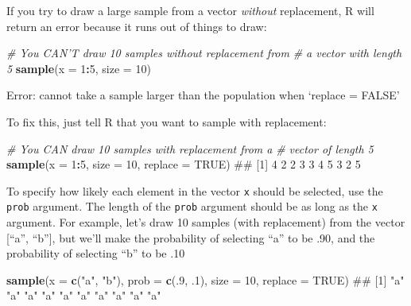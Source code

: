 \documentclass[]{book}
\newenvironment{Shaded}{\begin{snugshade}}{\end{snugshade}}
\newcommand{\KeywordTok}[1]{\textcolor[rgb]{0.13,0.29,0.53}{\textbf{#1}}}
\newcommand{\DataTypeTok}[1]{\textcolor[rgb]{0.13,0.29,0.53}{#1}}
\newcommand{\DecValTok}[1]{\textcolor[rgb]{0.00,0.00,0.81}{#1}}
\newcommand{\StringTok}[1]{\textcolor[rgb]{0.31,0.60,0.02}{#1}}
\newcommand{\CommentTok}[1]{\textcolor[rgb]{0.56,0.35,0.01}{\textit{#1}}}
\newcommand{\OtherTok}[1]{\textcolor[rgb]{0.56,0.35,0.01}{#1}}
\newcommand{\OperatorTok}[1]{\textcolor[rgb]{0.81,0.36,0.00}{\textbf{#1}}}
\newcommand{\NormalTok}[1]{#1}
\theoremstyle{definition}
\theoremstyle{definition}
\theoremstyle{remark}
\begin{document}
If you try to draw a large sample from a vector \textit{without}
replacement, R will return an error because it runs out of things to
draw:

\begin{Shaded}
\begin{Highlighting}[]
\CommentTok{# You CAN'T draw 10 samples without replacement from}
\CommentTok{#  a vector with length 5}
\KeywordTok{sample}\NormalTok{(}\DataTypeTok{x =} \DecValTok{1}\OperatorTok{:}\DecValTok{5}\NormalTok{, }\DataTypeTok{size =} \DecValTok{10}\NormalTok{)}
\end{Highlighting}
\end{Shaded}

Error: cannot take a sample larger than the population when `replace =
FALSE'

To fix this, just tell R that you want to sample with replacement:

\begin{Shaded}
\begin{Highlighting}[]
\CommentTok{# You CAN draw 10 samples with replacement from a}
\CommentTok{#  vector of length 5}
\KeywordTok{sample}\NormalTok{(}\DataTypeTok{x =} \DecValTok{1}\OperatorTok{:}\DecValTok{5}\NormalTok{, }\DataTypeTok{size =} \DecValTok{10}\NormalTok{, }\DataTypeTok{replace =} \OtherTok{TRUE}\NormalTok{)}
\NormalTok{##  [1] 4 2 2 3 3 4 5 3 2 5}
\end{Highlighting}
\end{Shaded}

To specify how likely each element in the vector \texttt{x} should be
selected, use the \texttt{prob} argument. The length of the
\texttt{prob} argument should be as long as the \texttt{x} argument. For
example, let's draw 10 samples (with replacement) from the vector
{[}``a'', ``b''{]}, but we'll make the probability of selecting ``a'' to
be .90, and the probability of selecting ``b'' to be .10

\begin{Shaded}
\begin{Highlighting}[]
\KeywordTok{sample}\NormalTok{(}\DataTypeTok{x =} \KeywordTok{c}\NormalTok{(}\StringTok{"a"}\NormalTok{, }\StringTok{"b"}\NormalTok{), }
       \DataTypeTok{prob =} \KeywordTok{c}\NormalTok{(.}\DecValTok{9}\NormalTok{, .}\DecValTok{1}\NormalTok{),}
       \DataTypeTok{size =} \DecValTok{10}\NormalTok{, }
       \DataTypeTok{replace =} \OtherTok{TRUE}\NormalTok{)}
\NormalTok{##  [1] "a" "a" "a" "a" "a" "a" "a" "a" "a" "a"}
\end{Highlighting}
\end{Shaded}
\end{document}
